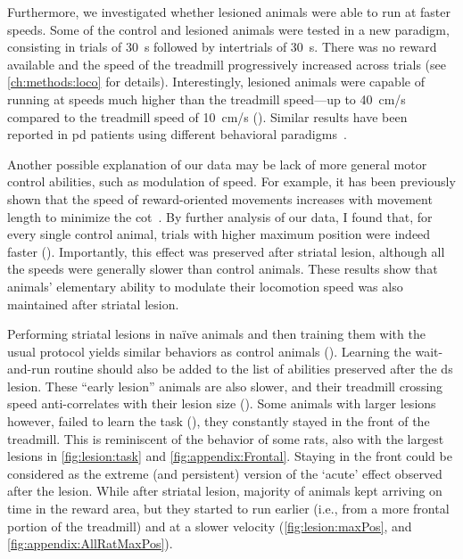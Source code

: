 Furthermore, we investigated whether lesioned animals were able to run at faster speeds.
Some of the control and lesioned animals were tested in a new paradigm, consisting in trials of 30~s followed by intertrials of 30~s.
There was no reward available and the speed of the treadmill progressively increased across trials (see \autoref{ch:methods:loco} for details).
Interestingly, lesioned animals were capable of running at speeds much higher than the treadmill speed---up to 40~cm/s compared to the treadmill speed of 10~cm/s ().
Similar results have been reported in \gls{pd} patients using different behavioral paradigms~\cite{Mazzoni2007, Schmidt2008Brain}.
\par
Another possible explanation of our data may be lack of more general motor control abilities, such as modulation of speed.
For example, it has been previously shown that the speed of reward-oriented movements increases with movement length to minimize the \gls{cot}~\cite{Shadmehr2010Jneurosci}.
By further analysis of our data, I found that, for every single control animal, trials with higher maximum position were indeed faster ().
Importantly, this effect was preserved after striatal lesion, although all the speeds were generally slower than control animals.
These results show that animals' elementary ability to modulate their locomotion speed was also maintained after striatal lesion.
\par
Performing striatal lesions in na\"{i}ve animals and then training them with the usual protocol yields similar behaviors as control animals ().
Learning the wait-and-run routine should also be added to the list of abilities preserved after the \gls{ds} lesion.
These ``early lesion'' animals are also slower, and their treadmill crossing speed anti-correlates with their lesion size ().
Some animals with larger lesions however, failed to learn the task (), they constantly stayed in the front of the treadmill.
This is reminiscent of the behavior of some rats, also with the largest lesions in \autoref{fig:lesion:task} and \autoref{fig:appendix:Frontal}.
Staying in the front could be considered as the extreme (and persistent) version of the `acute' effect observed after the lesion.
While after striatal lesion, majority of animals kept arriving on time in the reward area, but they started to run earlier (i.e., from a more frontal portion of the treadmill) and at a slower velocity (\autoref{fig:lesion:maxPos}, and \autoref{fig:appendix:AllRatMaxPos}).\footnotemark
